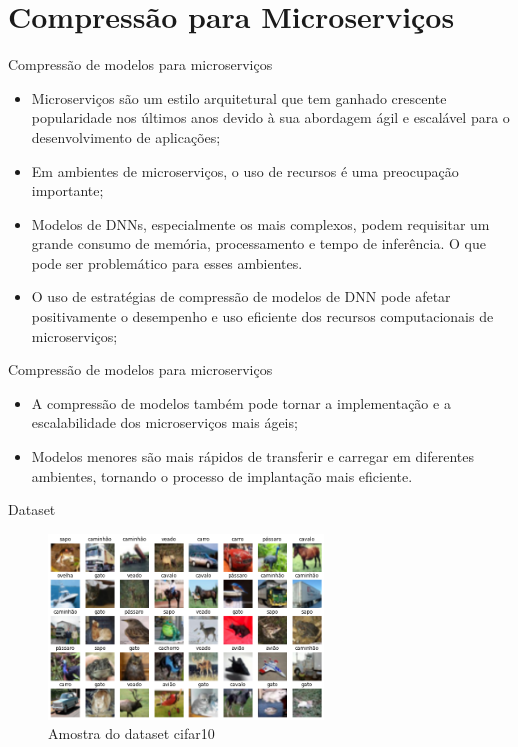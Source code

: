 \section{Compressão para Microserviços}

\begin{frame}{Compressão de modelos para microserviços}
    \begin{itemize}
        \item Microserviços são um estilo arquitetural que tem ganhado crescente popularidade nos últimos anos devido à sua abordagem ágil e escalável para o desenvolvimento de aplicações;
        \item Em ambientes de microserviços, o uso de recursos é uma preocupação importante;
        \item Modelos de DNNs, especialmente os mais complexos, podem requisitar um grande consumo de memória, processamento e tempo de inferência. O que pode ser problemático para esses ambientes.
        \item O uso de estratégias de compressão de modelos de DNN pode afetar positivamente o desempenho e uso eficiente dos recursos computacionais de microserviços;
    \end{itemize}
\end{frame}


\begin{frame}{Compressão de modelos para microserviços}
    \begin{itemize}
        \item A compressão de modelos também pode tornar a implementação e a escalabilidade dos microserviços mais ágeis;
        \item Modelos menores são mais rápidos de transferir e carregar em diferentes ambientes, tornando o processo de implantação mais eficiente.
    \end{itemize}
\end{frame}

\begin{frame}{Dataset}
    \begin{figure}[H]
    \centering
    \includegraphics[width=0.65\textwidth]{figuras/cifar10ex.png}
    \caption{Amostra do dataset cifar10}
    \end{figure}
\end{frame}

